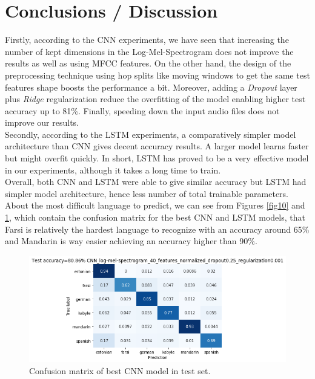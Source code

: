 \documentclass[12pt]{extarticle}
\begin{document}
\newpage

\section{Conclusions / Discussion}

Firstly, according to the CNN experiments, we have seen that increasing the number of kept dimensions in the Log-Mel-Spectrogram does not improve the results as well as using MFCC features. On the other hand, the design of the preprocessing technique using hop splits like moving windows to get the same test features shape boosts the performance a bit. Moreover, adding a \textit{Dropout} layer plus \textit{Ridge} regularization reduce the overfitting of the model enabling higher test accuracy up to 81\%. Finally, speeding down the input audio files does not improve our results.\\

\noindent Secondly, according to the LSTM experiments, a comparatively simpler model architecture than CNN gives decent accuracy results. A larger model learns faster but might overfit quickly. In short, LSTM has proved to be a very effective model in our experiments, although it takes a long time to train.\\

\noindent Overall, both CNN and LSTM were able to give similar accuracy but LSTM had simpler model architecture, hence less number of total trainable parameters. About the most difficult language to predict, we can see from Figures \ref{fig10} and \ref{fig11}, which contain the confusion matrix for the best CNN and LSTM models, that Farsi is relatively the hardest language to recognize with an accuracy around 65\% and Mandarin is way easier achieving an accuracy higher than 90\%.

\begin{figure}[h]
\centering
\includegraphics[width=12cm]{Figures/9.png}
\caption{Confusion matrix of best CNN model in test set.}
\label{fig11}
\end{figure}
\end{document}
